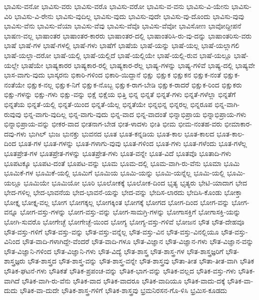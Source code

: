 {ಭಾವಿಸು-ವನೋ
ಭಾವಿಸು-ವರು
ಭಾವಿಸು-ವರೊ
ಭಾವಿಸು-ವರೋ
ಭಾವಿಸು-ವ-ವನು
ಭಾವಿಸು-ವಿ-ಯೇನು
ಭಾವಿಸು-ವಿರಿ
ಭಾವಿಸು-ವಿ-ರೇನು
ಭಾವಿಸು-ವುದಿಲ್ಲ
ಭಾವಿಸು-ವುದು
ಭಾವಿಸು-ವುದೇ
ಭಾವಿಸು-ವು-ದೊಂದು
ಭಾವಿಸು-ವುವು
ಭಾವಿಸು-ವೆನು
ಭಾವಿಸು-ವೆಯಾ
ಭಾವಿಸು-ವೆವು
ಭಾವಿಸು-ವೆವೊ
ಭಾವಿಸು-ವೆವೋ
ಭಾವಿಸೋಣ
ಭಾವೋದ್ದೀಪನೆ
ಭಾಷಣ-ವಲ್ಲ
ಭಾಷಾಂತರ
ಭಾಷಾಂತರ-ಕಾರರು
ಭಾಷಾಂತರ-ದಲ್ಲಿ
ಭಾಷಾಂತರಿಸಿ-ರು-ವು-ದನ್ನು
ಭಾಷಾಂತರಿಸು-ವರು
ಭಾಷೆ
ಭಾಷೆ-ಗಳ
ಭಾಷೆ-ಗಳಲ್ಲಿ
ಭಾಷೆ-ಗಳು
ಭಾಷೆಗೆ
ಭಾಷೆಯ
ಭಾಷೆ-ಯನ್ನು
ಭಾಷೆ-ಯಲ್ಲ
ಭಾಷೆ-ಯಲ್ಲಾಗಲಿ
ಭಾಷೆ-ಯಲ್ಲಾ-ದರೋ
ಭಾಷೆ-ಯಲ್ಲಿ
ಭಾಷೆ-ಯಲ್ಲಿದೆ
ಭಾಷೆ-ಯಲ್ಲಿಯೇ
ಭಾಷೆ-ಯಲ್ಲಿ-ರುವ
ಭಾಷೆ-ಯಲ್ಲೂ
ಭಾಷೆ-ಯಲ್ಲೇ
ಭಾಷೆಯೇ
ಭಾಷ್ಯಕಾರರ
ಭಾಷ್ಯಕಾರ-ರಲ್ಲಿ
ಭಾಷ್ಯಕಾರ-ರೆಲ್ಲ
ಭಾಷ್ಯ-ಗಳನ್ನು
ಭಾಷ್ಯ-ಗಳಿವೆ
ಭಾಷ್ಯ-ದಲ್ಲಿ
ಭಾಷ್ಯವೇ
ಭಾಸ-ವಾಗು-ವುದು
ಭಾಸ್ಕರನು
ಭಿಕಾರಿ-ಗಳಿಂದ
ಭಿಕಾರಿ-ಯಿದ್ದಾನೆ
ಭಿಕ್ಷು
ಭಿಕ್ಷುಕ
ಭಿಕ್ಷುಕನ
ಭಿಕ್ಷುಕ-ನಂತೆ
ಭಿಕ್ಷುಕ-ನಂತೆಯೇ
ಭಿಕ್ಷುಕ-ನಲ್ಲ
ಭಿಕ್ಷುಕ-ನಿಗೆ
ಭಿಕ್ಷುಕ-ನೊಬ್ಬ
ಭಿಕ್ಷುಕ-ರಾಗ-ಬೇಡಿ
ಭಿಕ್ಷುಕ-ರಾದರೆ
ಭಿಕ್ಷುಕ-ರಿಂದ
ಭಿಕ್ಷುಕರು
ಭಿಕ್ಷು-ಗಳನ್ನು
ಭಿಕ್ಷು-ಗಳು
ಭಿಕ್ಷು-ವನ್ನು
ಭಿಕ್ಷೆ
ಭಿಕ್ಷೆಯ
ಭಿತ್ತಿ
ಭಿನ್ನ
ಭಿನ್ನತೆ
ಭಿನ್ನತೆ-ಗಳು
ಭಿನ್ನತೆ-ಗಳೆಲ್ಲಾ
ಭಿನ್ನತೆಗೆ
ಭಿನ್ನತೆಯ
ಭಿನ್ನತೆ-ಯಲ್ಲಿ
ಭಿನ್ನತೆ-ಯಿಂದ
ಭಿನ್ನತೆ-ಯೆಲ್ಲ
ಭಿನ್ನತೆಯೇ
ಭಿನ್ನಭಿನ್ನ
ಭಿನ್ನರಲ್ಲ
ಭಿನ್ನರೂಪ
ಭಿನ್ನ-ವಾಗಿ-ರುವುವು
ಭಿನ್ನ-ವಾಗು-ವುದಿಲ್ಲ
ಭಿನ್ನ-ವಾಗು-ವುದು
ಭಿನ್ನ-ವಾದ
ಭಿನ್ನ-ವಾದಂತೆ
ಭಿನ್ನಾಭಿಪ್ರಾಯ
ಭಿನ್ನಾಭಿಪ್ರಾಯ-ಗಳು
ಭಿನ್ನಾಭಿಪ್ರಾಯ-ವನ್ನು
ಭೀಕರ-ವಾದ
ಭೀತನಾಗ-ಬೇಡ
ಭೀತ-ಳಾದಳು
ಭೀತಿ
ಭೀಮ
ಭೀಮ-ನಂತಹ-ವರು
ಭೀಮಾಕಾರ-ದವು-ಗಳು
ಭುಗಿಲ್
ಭುಜ
ಭುನಕ್ತು
ಭುವನದ
ಭೂತ
ಭೂತ-ಕನ್ನಡಿಯ
ಭೂತ-ಕಾಲ
ಭೂತ-ಕಾಲದ
ಭೂತ-ಕಾಲ-ದಿಂದ
ಭೂತ-ಗಳ
ಭೂತ-ಗಳನ್ನು
ಭೂತ-ಗಳಾಗು-ವುವು
ಭೂತ-ಗಳಿಂದ
ಭೂತ-ಗಳು
ಭೂತ-ಗಳೆಂದು
ಭೂತ-ಗಳೆಲ್ಲ
ಭೂತಪ್ರೇತ-ಗಳ
ಭೂತಪ್ರೇತ-ಗಳನ್ನು
ಭೂತಪ್ರೇತ-ಗಳು
ಭೂತ-ವನ್ನೇ
ಭೂತ-ವಿದೆ
ಭೂತವೊ
ಭೂತಾದಿ-ಗಳು
ಭೂಪಟಕ್ಕೂ
ಭೂಪಟ-ದಂತೆ
ಭೂಪಟ-ವನ್ನು
ಭೂಮ
ಭೂಮ-ದಲ್ಲಿ
ಭೂಮ-ವಾಗಿ-ರು-ವೆನು
ಭೂಮಾ
ಭೂಮಿ
ಭೂಮಿಕೆ-ಗಳ
ಭೂಮಿಕೆ-ಯಲ್ಲಿ
ಭೂಮಿಗೆ
ಭೂಮಿಯ
ಭೂಮಿ-ಯನ್ನು
ಭೂಮಿ-ಯನ್ನೆಲ್ಲ
ಭೂಮಿ-ಯಲ್ಲಿ
ಭೂಮಿ-ಯಲ್ಲೂ
ಭೂಮಿಯೇ
ಭೂಮಿಯೋ
ಭೂರಿ
ಭೂಲೋಕಕ್ಕೆ
ಭೂಲೋಕ-ದಿಂದ
ಭೃತ್ಯ
ಭೃತ್ಯರು
ಭೇಟಿ-ಯಾದಾಗ
ಭೇದ
ಭೇದ-ಗಳಿಲ್ಲ
ಭೇದ-ಭಾವನೆಯ
ಭೇದ-ಭಾವನೆ-ಯನ್ನು
ಭೇದ-ವನ್ನು
ಭೇದಿಸ-ಲಾರದು
ಭೇದಿಸಿ-ಕೊಂಡು
ಭೋಕ್ತಾ
ಭೋಕ್ತೃ
ಭೋಕ್ತೃ-ವಲ್ಲ
ಭೋಗ
ಭೋಗಕ್ಕಲ್ಲ
ಭೋಗಕ್ಕಿಂತ
ಭೋಗಕ್ಕೆ
ಭೋಗದ
ಭೋಗ-ದಿಂದ
ಭೋಗ-ವನ್ನು
ಭೋಗ-ವನ್ನೂ
ಭೋಗ-ವಸ್ತು-ಗಳನ್ನು
ಭೋಗ-ವಸ್ತು-ವನ್ನು
ಭೋಗ-ಸಾಮಗ್ರಿ-ಗಳನ್ನು
ಭೋಗಾಸಕ್ತಿಗೆ
ಭೋಗಾಸಕ್ತಿ-ಯನ್ನು
ಭೋಗಿ-ಸುವರೊ
ಭೋಗೇಚ್ಛೆ
ಭೋಗೇಚ್ಛೆ-ಯಿಂದ
ಭೋಗ್ಯ
ಭೋಗ್ಯ-ವಸ್ತು-ಗಳಿವೆ
ಭೋಜನ
ಭೌತ
ಭೌತ-ದೇಹವೂ
ಭೌತ-ವಸ್ತು-ಗಳಿಗೆ
ಭೌತ-ವಸ್ತು-ವನ್ನು
ಭೌತ-ವಸ್ತು-ವನ್ನೆಲ್ಲ
ಭೌತ-ವಸ್ತು-ವಿನ
ಭೌತ-ವಸ್ತು-ವಿನಲ್ಲಿಯೂ
ಭೌತ-ವಸ್ತು-ವಿನಿಂದ
ಭೌತ-ವಾದಿ-ಗಳಾಗಿದ್ದೇ-ವೆಂದರೆ
ಭೌತ-ವಾದಿ-ಗಳೂ
ಭೌತ-ವಿಜ್ಞಾನ
ಭೌತ-ವಿಜ್ಞಾನ-ಗಳು
ಭೌತ-ವಿಜ್ಞಾನ-ವನ್ನು
ಭೌತ-ವಿಜ್ಞಾನಿ-ಗಳಿಂದ
ಭೌತ-ವಿಜ್ಞಾನಿ-ಗಳು
ಭೌತ-ವಿದ್ಯೆ
ಭೌತ-ಶಾಸ್ತ್ರ
ಭೌತ-ಶಾಸ್ತ್ರ-ಗಳ
ಭೌತ-ಶಾಸ್ತ್ರಜ್ಞರಿಗೆ
ಭೌತ-ಶಾಸ್ತ್ರಜ್ಞರು
ಭೌತ-ಶಾಸ್ತ್ರದ
ಭೌತ-ಶಾಸ್ತ್ರ-ವನ್ನು
ಭೌತ-ಶಾಸ್ತ್ರ-ವನ್ನೇ
ಭೌತ-ಶಾಸ್ತ್ರವು
ಭೌತಾ-ತೀತ
ಭೌತಾ-ತೀತ-ವಾಗಿ
ಭೌತಿಕ
ಭೌತಿಕ-ಘಟನೆ-ಗಳು
ಭೌತಿಕತೆ
ಭೌತಿಕ-ಪ್ರಪಂಚ-ವನ್ನು
ಭೌತಿಕ-ಭಾಗ-ವನ್ನು
ಭೌತಿಕ-ವಲ್ಲದ
ಭೌತಿಕ-ವಸ್ತು-ಗಳು
ಭೌತಿಕ-ವಾಗಿದೆ
ಭೌತಿಕ-ವಾಗಿ-ರು-ವೆನು
ಭೌತಿಕ-ವಾದ
ಭೌತಿಕ-ವಾದರೂ
ಭೌತಿಕ-ವಾದಿಯೂ
ಭೌತಿಕ-ವಾದು-ದಕ್ಕೆ
ಭೌತಿಕ-ವಾ-ದುದು
ಭೌತಿಕ-ವಾ-ದುದೇ
ಭೌತಿಕ-ಶಾಸ್ತ್ರ-ಗಳಿಗೆ
ಭೌತಿಕ-ಶಾಸ್ತ್ರವು
ಭ್ರಮನಿರಸನ-ಗೊ-ಳಿಸಿ
ಭ್ರಮಿಸ-ಕೂಡದು
}
